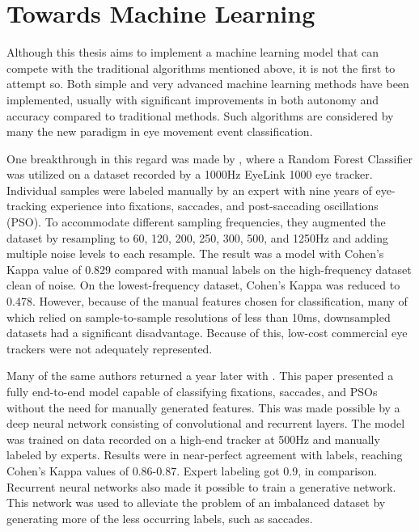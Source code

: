 \section{Towards Machine Learning} \label{sec:pw_TowardsMachineLearning}

Although this thesis aims to implement a machine learning model that can compete with the traditional algorithms mentioned above, it is not the first to attempt so. Both simple and very advanced machine learning methods have been implemented, usually with significant improvements in both autonomy and accuracy compared to traditional methods. Such algorithms are considered by many the new paradigm in eye movement event classification.

One breakthrough in this regard was made by \cite{zemblys2017}, where a Random Forest Classifier was utilized on a dataset recorded by a 1000Hz EyeLink 1000 eye tracker. Individual samples were labeled manually by an expert with nine years of eye-tracking experience into fixations, saccades, and post-saccading oscillations (PSO). To accommodate different sampling frequencies, they augmented the dataset by resampling to 60, 120, 200, 250, 300, 500, and 1250Hz and adding multiple noise levels to each resample. The result was a model with Cohen's Kappa value of 0.829 compared with manual labels on the high-frequency dataset clean of noise. On the lowest-frequency dataset, Cohen's Kappa was reduced to 0.478. However, because of the manual features chosen for classification, many of which relied on sample-to-sample resolutions of less than 10ms, downsampled datasets had a significant disadvantage. Because of this, low-cost commercial eye trackers were not adequately represented.

Many of the same authors returned a year later with \cite{zemblys2018}. This paper presented a fully end-to-end model capable of classifying fixations, saccades, and PSOs without the need for manually generated features. This was made possible by a deep neural network consisting of convolutional and recurrent layers. The model was trained on data recorded on a high-end tracker at 500Hz and manually labeled by experts. Results were in near-perfect agreement with labels, reaching Cohen's Kappa values of 0.86-0.87. Expert labeling got 0.9, in comparison. Recurrent neural networks also made it possible to train a generative network. This network was used to alleviate the problem of an imbalanced dataset by generating more of the less occurring labels, such as saccades.

